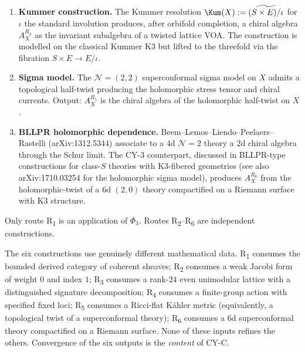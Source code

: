 \begin{definition}
\begin{enumerate}[label=\textbf{R\arabic*.}]
 \item \textbf{Kummer construction.} The Kummer resolution $\Kum(X) := \widetilde{(S \times E)/\iota}$ for $\iota$ the standard involution produces, after orbifold completion, a chiral algebra $A_X^{R_4}$ as the invariant subalgebra of a twisted lattice VOA. The construction is modelled on the classical Kummer K3 but lifted to the threefold via the fibration $S \times E \to E/\iota$.
 \item \textbf{Sigma model.} The $\mathcal{N} = (2,2)$ superconformal sigma model on $X$ admits a topological half-twist producing the holomorphic stress tensor and chiral currents. Output: $A_X^{R_5}$ is the chiral algebra of the holomorphic half-twist on $X$.
 \item \textbf{BLLPR holomorphic dependence.} Beem--Lemos--Liendo--Peelaers--Rastelli (arXiv:1312.5344) associate to a $4$d $\mathcal{N} = 2$ theory a $2$d chiral algebra through the Schur limit. The CY-3 counterpart, discussed in BLLPR-type constructions for class-$S$ theories with K3-fibered geometries (see also arXiv:1710.03254 for the holomorphic sigma model), produces $A_X^{R_6}$ from the holomorphic-twist of a $6$d $(2,0)$ theory compactified on a Riemann surface with K3 structure.
\end{enumerate}
Only route R\textsubscript{1} is an application of $\Phi_3$. Routes R\textsubscript{2}--R\textsubscript{6} are independent constructions.
\end{definition}

\begin{remark}
\label{rem:six-routes-irreducible}
The six constructions use genuinely different mathematical data. R\textsubscript{1} consumes the bounded derived category of coherent sheaves; R\textsubscript{2} consumes a weak Jacobi form of weight $0$ and index $1$; R\textsubscript{3} consumes a rank-$24$ even unimodular lattice with a distinguished signature decomposition; R\textsubscript{4} consumes a finite-group action with specified fixed loci; R\textsubscript{5} consumes a Ricci-flat K\"ahler metric (equivalently, a topological twist of a superconformal theory); R\textsubscript{6} consumes a $6$d superconformal theory compactified on a Riemann surface. None of these inputs refines the others. Convergence of the six outputs is the \emph{content} of CY-C.
\end{remark}

